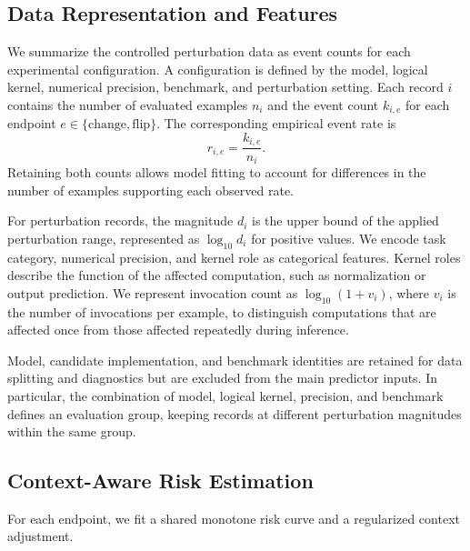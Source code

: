 \documentclass{article}
\begin{document}
\subsection{Data Representation and Features}
\label{sec:data-representation}

We summarize the controlled perturbation data as event counts for each experimental configuration.
A configuration is defined by the model, logical kernel, numerical precision, benchmark, and perturbation setting.
Each record $i$ contains the number of evaluated examples $n_i$ and the event count $k_{i,e}$ for each endpoint $e\in\{\mathrm{change},\mathrm{flip}\}$.
The corresponding empirical event rate is
\begin{equation}
r_{i,e}=\frac{k_{i,e}}{n_i}.
\label{eq:empirical-event-rate}
\end{equation}
Retaining both counts allows model fitting to account for differences in the number of examples supporting each observed rate.

For perturbation records, the magnitude $d_i$ is the upper bound of the applied perturbation range, represented as $\log_{10}d_i$ for positive values.
We encode task category, numerical precision, and kernel role as categorical features.
Kernel roles describe the function of the affected computation, such as normalization or output prediction.
We represent invocation count as $\log_{10}(1+v_i)$, where $v_i$ is the number of invocations per example, to distinguish computations that are affected once from those affected repeatedly during inference.

Model, candidate implementation, and benchmark identities are retained for data splitting and diagnostics but are excluded from the main predictor inputs.
In particular, the combination of model, logical kernel, precision, and benchmark defines an evaluation group, keeping records at different perturbation magnitudes within the same group.

\subsection{Context-Aware Risk Estimation}
\label{sec:risk-estimation}

For each endpoint, we fit a shared monotone risk curve and a regularized context adjustment.
\end{document}

